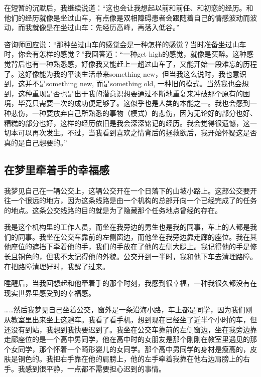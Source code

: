 在短暂的沉默后，我继续说道：“这也会让我想起以前和前任、和初恋的经历。和他们的经历就像是坐过山车，有点像是双相障碍患者会跟随着自己的情感波动而波动，而我就像是在坐过山车：先经历高峰，再落入低谷。”

咨询师回应说：“那种坐过山车的感觉会是一种怎样的感觉？当时准备坐过山车时，你会有怎样的感觉？”我回答道：“一种get high的感觉，就像是买醉。这种感觉背后也有一种熟悉感，好像我又能赶上一趟过山车了，又能开始一段难忘的历程了。这好像能为我的平淡生活带来something new，但当我这么说时，我也意识到，这并不是something new, 而是something old, 一种旧的模式。当然我也会想到，这种重现是否也是出于我的潜意识想要通过不断地重复来冲破那个原有的困境，毕竟只需要一次的成功便足够了。这似乎也是人类的本能之一。我也会感到一种悲伤，一种要放弃自己所熟悉的事物（模式）的悲伤，因为无论好的部分也好、糟糕的部分也好，这样的经历依旧是我会深深铭记的经历。我会觉得很遗憾，这一切本可以再次发生。不过，当我看到喜欢之情背后的拯救欲后，我开始怀疑这是否真的是自己想要的。”



\subsection*{在梦里牵着手的幸福感}

我梦见自己在一辆公交上，这辆公交开在一个日落下的山坡小路上。这部公交要开往一个很远的地方，因为这条线路是由一个机构的总部开向一个已经完成了的任务的地点。这条公交线路的目的就是为了隐藏那个任务地点曾经的存在。

我是这个机构里的工作人员，而坐在我旁边的男生也是我的同事，车上的人都是我们的同事。我坐在公交车靠前的左侧窗边，而他坐在我旁边靠走廊的座位。我在其他座位的遮挡下牵着他的手，我们的手放在了他的左侧大腿上。我记得他的手是修长且铜色的，但我不太记得他的外貌。公交开到一半时，我和他下车去清理路障。在把路障清理好时，我醒了过来。

睡醒后，当我回想起和他牵着手的那个时刻，我感到很幸福，一种我很久都没有在现实世界里感受到的幸福感。

……然后我梦见自己坐着公交，窗外是一条沿海小路，车上都是同学，因为我们刚从教室里出来坐上这趟车。我看了看手机，想到现在已经坐了近半个小时的车，但还没有到站，我想到我快要迟到了。我坐在公交车靠前的左侧窗边，坐在我旁边靠走廊座位的是一个高中男同学，他在高中时的女朋友是那个刚刚在教室里遇见的那个女同学，那个怀着一个畸形婴儿的女同学。那个高中男同学的身材是瘦高的，皮肤是铜色的。我把右手靠在他的肩膀上，他的左手牵着我靠在他右边肩膀上的右手。我感到很平静，一点都不需要担心迟到的事情。

